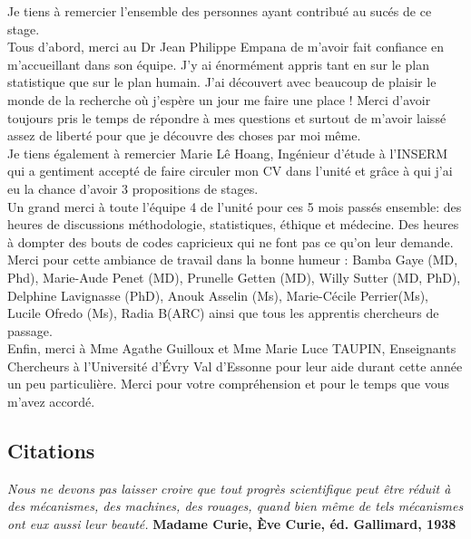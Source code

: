 \documentclass{book}
\begin{document}
\noindent
Je tiens à remercier l'ensemble des personnes ayant contribué au sucés de ce stage.\\

\noindent
Tous d'abord, merci au Dr Jean Philippe Empana de m'avoir fait confiance en m'accueillant dans son équipe. 
J'y ai énormément appris tant en sur le plan statistique que sur le plan humain. J'ai découvert avec beaucoup de plaisir le monde de la recherche où j'espère un jour me faire une place !
Merci d'avoir toujours pris le temps de répondre à mes questions et surtout de m'avoir laissé assez de liberté pour que je découvre des choses par moi même.\\

\noindent
Je tiens également à remercier Marie Lê Hoang, Ingénieur d'étude à l'INSERM qui a gentiment accepté de faire circuler mon CV dans l'unité et grâce à qui j'ai eu la chance d'avoir 3 propositions de stages.\\

\noindent
Un grand merci à toute l'équipe 4 de l'unité pour ces 5 mois passés ensemble: des heures de discussions méthodologie, statistiques, éthique et médecine. Des heures à dompter des bouts de codes capricieux qui ne font pas ce qu'on leur demande. Merci pour cette ambiance de travail dans la bonne humeur : Bamba Gaye (MD, Phd), Marie-Aude Penet (MD), Prunelle Getten (MD), Willy Sutter (MD, PhD), Delphine Lavignasse (PhD), Anouk Asselin (Ms), Marie-Cécile Perrier(Ms), Lucile Ofredo (Ms), Radia B(ARC) ainsi que tous les apprentis chercheurs de passage.\\

\noindent
Enfin, merci à Mme Agathe Guilloux et Mme Marie Luce TAUPIN, Enseignants Chercheurs à l'Université d'Évry Val 
d'Essonne pour leur aide durant cette année un peu particulière. Merci pour votre compréhension et pour le temps que vous m'avez accordé.


\newpage
\begin{center}
\section*{Citations}
\end{center} 

\bigskip


\begin{flushright}
\textit{Nous ne devons pas laisser croire que tout progrès scientifique peut être réduit à des mécanismes, des machines, des rouages, quand bien même de tels mécanismes ont eux aussi leur beauté.}
\textbf{Madame Curie, Ève Curie, éd. Gallimard, 1938}
\end{flushright}
\end{document}
